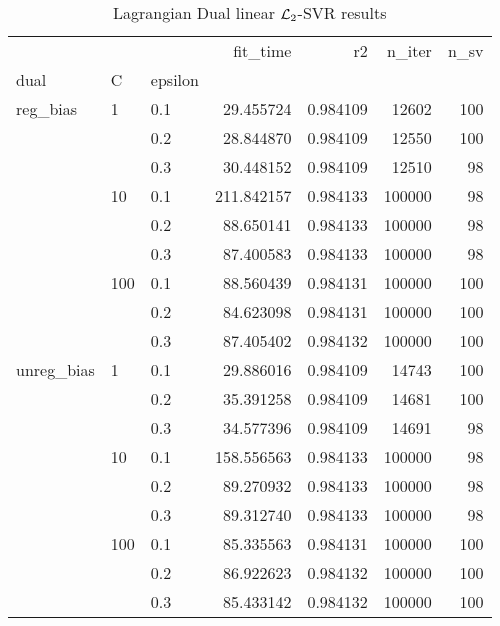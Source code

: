 \begin{table}[H]
\centering
\caption{Lagrangian Dual linear $\protect \mathcal{L}_2$-SVR results}
\label{linear_lagrangian_dual_l2_svr_cv_results}
\begin{tabular}{lllrrrr}
\toprule
           &     &     &    fit\_time &        r2 &  n\_iter &  n\_sv \\
dual & C & epsilon &             &           &         &       \\
\midrule
reg\_bias & 1   & 0.1 &   29.455724 &  0.984109 &   12602 &   100 \\
           &     & 0.2 &   28.844870 &  0.984109 &   12550 &   100 \\
           &     & 0.3 &   30.448152 &  0.984109 &   12510 &    98 \\
           & 10  & 0.1 &  211.842157 &  0.984133 &  100000 &    98 \\
           &     & 0.2 &   88.650141 &  0.984133 &  100000 &    98 \\
           &     & 0.3 &   87.400583 &  0.984133 &  100000 &    98 \\
           & 100 & 0.1 &   88.560439 &  0.984131 &  100000 &   100 \\
           &     & 0.2 &   84.623098 &  0.984131 &  100000 &   100 \\
           &     & 0.3 &   87.405402 &  0.984132 &  100000 &   100 \\
unreg\_bias & 1   & 0.1 &   29.886016 &  0.984109 &   14743 &   100 \\
           &     & 0.2 &   35.391258 &  0.984109 &   14681 &   100 \\
           &     & 0.3 &   34.577396 &  0.984109 &   14691 &    98 \\
           & 10  & 0.1 &  158.556563 &  0.984133 &  100000 &    98 \\
           &     & 0.2 &   89.270932 &  0.984133 &  100000 &    98 \\
           &     & 0.3 &   89.312740 &  0.984133 &  100000 &    98 \\
           & 100 & 0.1 &   85.335563 &  0.984131 &  100000 &   100 \\
           &     & 0.2 &   86.922623 &  0.984132 &  100000 &   100 \\
           &     & 0.3 &   85.433142 &  0.984132 &  100000 &   100 \\
\bottomrule
\end{tabular}
\end{table}
